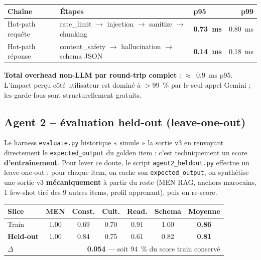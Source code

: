 \documentclass[11pt,a4paper]{article}
\begin{document}
\begin{center}
\small
\begin{tabular}{@{}lllr@{}}
\toprule
\textbf{Chaîne} & \textbf{Étapes} & \textbf{p95} & \textbf{p99} \\
\midrule
Hot-path requête  & rate\_limit $\to$ injection $\to$ sanitize $\to$ chunking
                  & \textbf{0.73~ms} & 0.80~ms \\
Hot-path réponse  & content\_safety $\to$ hallucination $\to$ schema JSON
                  & \textbf{0.14~ms} & 0.18~ms \\
\bottomrule
\end{tabular}
\end{center}

\textbf{Total overhead non-LLM par round-trip complet} : $\approx$~0.9~ms p95.
L'impact perçu côté utilisateur est dominé à $>$99~\% par le seul appel
Gemini ; les garde-fous sont structurellement gratuits.

\subsection{Agent 2 -- évaluation held-out (leave-one-out)}

Le harness \texttt{evaluate.py} historique « simule » la sortie v3 en
renvoyant directement le \texttt{expected\_output} du golden item : c'est
techniquement un score \textbf{d'entraînement}. Pour lever ce doute, le
script \texttt{agent2\_heldout.py} effectue un leave-one-out : pour chaque
item, on cache son \texttt{expected\_output}, on synthétise une sortie v3
\textbf{mécaniquement} à partir du reste (MEN RAG, anchors marocains, 1
few-shot tiré des 9 autres items, profil apprenant), puis on re-score.

\begin{center}
\small
\begin{tabular}{@{}lcccccc@{}}
\toprule
\textbf{Slice} & \textbf{MEN} & \textbf{Const.} & \textbf{Cult.} & \textbf{Read.} & \textbf{Schema} & \textbf{Moyenne} \\
\midrule
Train           & 1.00 & 0.69 & 0.70 & 0.91 & 1.00 & \textbf{0.86} \\
\textbf{Held-out} & 1.00 & 0.84 & 0.75 & 0.61 & 0.82 & \textbf{0.81} \\
\midrule
$\Delta$        & \multicolumn{6}{r}{\textbf{0.054} --- soit 94~\% du score train conservé} \\
\bottomrule
\end{tabular}
\end{center}
\end{document}
